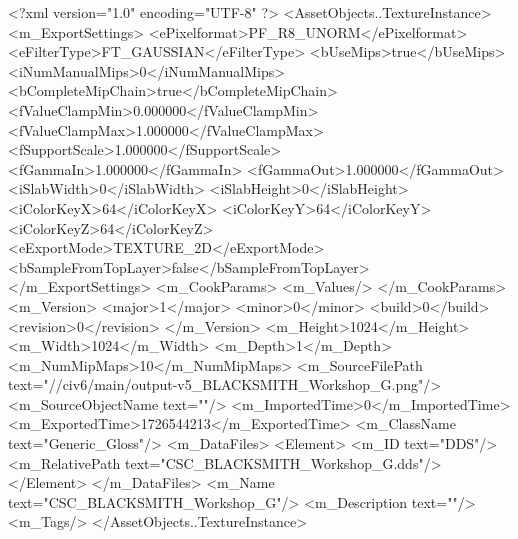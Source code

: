 <?xml version="1.0" encoding="UTF-8" ?>
<AssetObjects..TextureInstance>
	<m_ExportSettings>
		<ePixelformat>PF_R8_UNORM</ePixelformat>
		<eFilterType>FT_GAUSSIAN</eFilterType>
		<bUseMips>true</bUseMips>
		<iNumManualMips>0</iNumManualMips>
		<bCompleteMipChain>true</bCompleteMipChain>
		<fValueClampMin>0.000000</fValueClampMin>
		<fValueClampMax>1.000000</fValueClampMax>
		<fSupportScale>1.000000</fSupportScale>
		<fGammaIn>1.000000</fGammaIn>
		<fGammaOut>1.000000</fGammaOut>
		<iSlabWidth>0</iSlabWidth>
		<iSlabHeight>0</iSlabHeight>
		<iColorKeyX>64</iColorKeyX>
		<iColorKeyY>64</iColorKeyY>
		<iColorKeyZ>64</iColorKeyZ>
		<eExportMode>TEXTURE_2D</eExportMode>
		<bSampleFromTopLayer>false</bSampleFromTopLayer>
	</m_ExportSettings>
	<m_CookParams>
		<m_Values/>
	</m_CookParams>
	<m_Version>
		<major>1</major>
		<minor>0</minor>
		<build>0</build>
		<revision>0</revision>
	</m_Version>
	<m_Height>1024</m_Height>
	<m_Width>1024</m_Width>
	<m_Depth>1</m_Depth>
	<m_NumMipMaps>10</m_NumMipMaps>
	<m_SourceFilePath text="//civ6/main/output\blacksmith-v5\Textures\CSC_BLACKSMITH_Workshop_G.png"/>
	<m_SourceObjectName text=""/>
	<m_ImportedTime>0</m_ImportedTime>
	<m_ExportedTime>1726544213</m_ExportedTime>
	<m_ClassName text="Generic_Gloss"/>
	<m_DataFiles>
		<Element>
			<m_ID text="DDS"/>
			<m_RelativePath text="CSC_BLACKSMITH_Workshop_G.dds"/>
		</Element>
	</m_DataFiles>
	<m_Name text="CSC_BLACKSMITH_Workshop_G"/>
	<m_Description text=""/>
	<m_Tags/>
</AssetObjects..TextureInstance>

